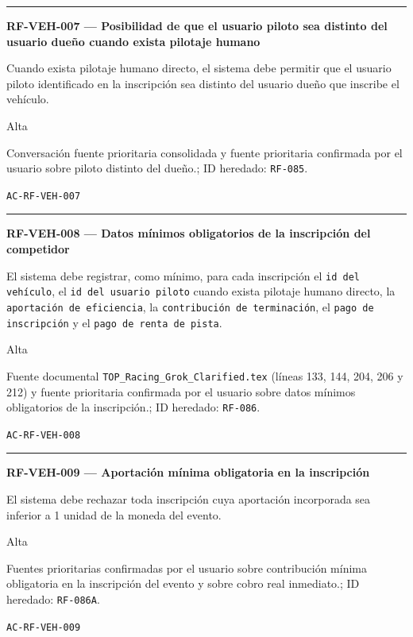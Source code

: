 \documentclass[10pt,letterpaper]{article}
\begin{document}
\vspace{0.25em}\hrule\vspace{0.65em}
\noindent\textbf{RF-VEH-007 --- Posibilidad de que el usuario piloto sea distinto del usuario dueño cuando exista pilotaje humano}\par
\begin{description}[style=nextline,leftmargin=3.15cm,labelwidth=2.8cm,font=\normalfont\bfseries]
\item[Obligación] Cuando exista pilotaje humano directo, el sistema debe permitir que el usuario piloto identificado en la inscripción sea distinto del usuario dueño que inscribe el vehículo.
\item[Prioridad] Alta
\item[Procedencia] Conversación fuente prioritaria consolidada y fuente prioritaria confirmada por el usuario sobre piloto distinto del dueño.; ID heredado: \texttt{RF-085}.
\item[Verificación] \texttt{AC-RF-VEH-007}
\end{description}
\vspace{0.25em}\hrule\vspace{0.65em}
\noindent\textbf{RF-VEH-008 --- Datos mínimos obligatorios de la inscripción del competidor}\par
\begin{description}[style=nextline,leftmargin=3.15cm,labelwidth=2.8cm,font=\normalfont\bfseries]
\item[Obligación] El sistema debe registrar, como mínimo, para cada inscripción el \texttt{id del vehículo}, el \texttt{id del usuario piloto} cuando exista pilotaje humano directo, la \texttt{aportación de eficiencia}, la \texttt{contribución de terminación}, el \texttt{pago de inscripción} y el \texttt{pago de renta de pista}.
\item[Prioridad] Alta
\item[Procedencia] Fuente documental \texttt{TOP\_Racing\_Grok\_Clarified.tex} (líneas 133, 144, 204, 206 y 212) y fuente prioritaria confirmada por el usuario sobre datos mínimos obligatorios de la inscripción.; ID heredado: \texttt{RF-086}.
\item[Verificación] \texttt{AC-RF-VEH-008}
\end{description}
\vspace{0.25em}\hrule\vspace{0.65em}
\noindent\textbf{RF-VEH-009 --- Aportación mínima obligatoria en la inscripción}\par
\begin{description}[style=nextline,leftmargin=3.15cm,labelwidth=2.8cm,font=\normalfont\bfseries]
\item[Obligación] El sistema debe rechazar toda inscripción cuya aportación incorporada sea inferior a 1 unidad de la moneda del evento.
\item[Prioridad] Alta
\item[Procedencia] Fuentes prioritarias confirmadas por el usuario sobre contribución mínima obligatoria en la inscripción del evento y sobre cobro real inmediato.; ID heredado: \texttt{RF-086A}.
\item[Verificación] \texttt{AC-RF-VEH-009}
\end{description}
\end{document}
